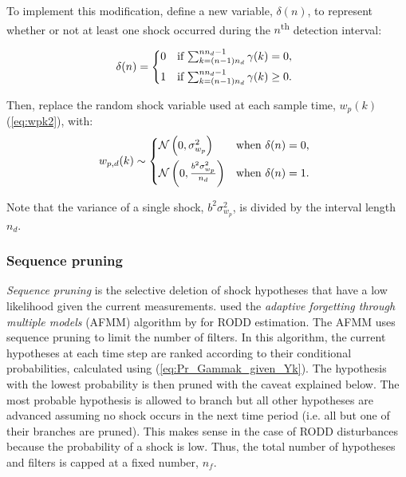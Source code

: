 To implement this modification, define a new variable, $\delta(n)$, to represent whether or not at least one shock occurred during the $n$\textsuperscript{th} detection interval:

\begin{equation} \label{eq:deltak}
	\delta(n) = \begin{cases*}
		0 & \text{if} $\sum_{k=(n-1) n_d}^{n n_d - 1} \gamma(k)=0$, \\
		1 & \text{if} $\sum_{k=(n-1) n_d}^{n n_d - 1} \gamma(k)\ge0$.
	\end{cases*}
\end{equation}

Then, replace the random shock variable used at each sample time, $w_p(k)$ (\ref{eq:wpk2}), with:
\begin{equation} \label{eq:wpdk}
	w_{p,d}(k) \sim 
	\begin{cases*}
		\mathcal{N}\left(0, \sigma_{w_p}^2\right) & \text{when} $\delta(n) = 0$, \\
		\mathcal{N}\left(0, \frac{b^2\sigma_{w_p}^2}{n_d}\right) & \text{when} $\delta(n) = 1$.
	\end{cases*}
\end{equation}

Note that the variance of a single shock, $b^2\sigma_{w_p}^2$, is divided by the interval length $n_d$.

\subsubsection{Sequence pruning} \label{subsec-pruning}

\textit{Sequence pruning} is the selective deletion of shock hypotheses that have a low likelihood given the current measurements. \cite{eriksson_classification_1996} used the \textit{adaptive forgetting through multiple models} (AFMM) algorithm by \cite{andersson_adaptive_1985} for RODD estimation. The AFMM uses sequence pruning to limit the number of filters. In this algorithm, the current hypotheses at each time step are ranked according to their conditional probabilities, calculated using (\ref{eq:Pr_Gammak_given_Yk}). The hypothesis with the lowest probability is then pruned with the caveat explained below. The most probable hypothesis is allowed to branch but all other hypotheses are advanced assuming no shock occurs in the next time period (i.e. all but one of their branches are pruned). This makes sense in the case of RODD disturbances because the probability of a shock is low. Thus, the total number of hypotheses and filters is capped at a fixed number, $n_f$.

